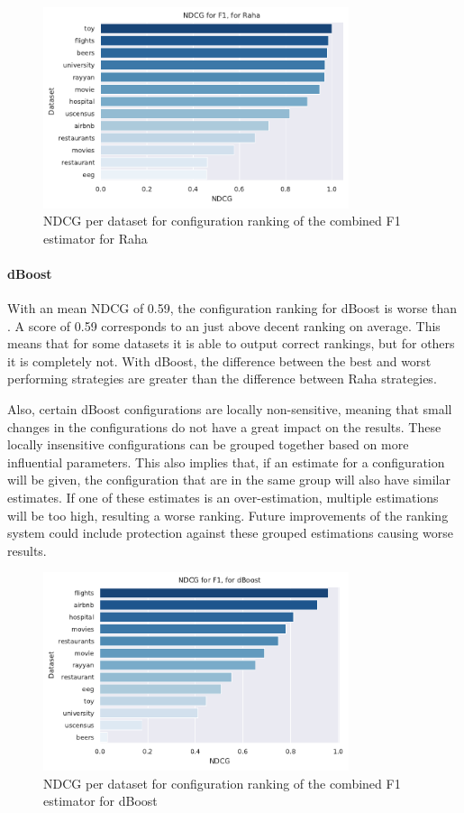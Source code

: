 \begin{figure}
    \centering
    \includegraphics[width=0.8\textwidth]{thesis/Figures/RQ3/15_combined_profiler_NDCG_Raha.pdf}
    \caption{NDCG per dataset for configuration ranking of the combined F1 estimator for Raha}
    \label{fig:ndcg_per_config_Raha}
\end{figure}

\paragraph{dBoost} With an mean NDCG of 0.59, the configuration ranking for dBoost is worse than . A score of 0.59 corresponds to an just above decent ranking on average. This means that for some datasets it is able to output correct rankings, but for others it is completely not. With dBoost, the difference between the best and worst performing strategies are greater than the difference between Raha strategies. 

Also, certain dBoost configurations are locally non-sensitive, meaning that small changes in the configurations do not have a great impact on the results. These locally insensitive configurations can be grouped together based on more influential parameters. This also implies that, if an estimate for a configuration will be given, the configuration that are in the same group will also have similar estimates. If one of these estimates is an over-estimation, multiple estimations will be too high, resulting a worse ranking. Future improvements of the ranking system could include protection against these grouped estimations causing worse results.

\begin{figure}[h]
    \centering
    \includegraphics[width=0.8\textwidth]{thesis/Figures/RQ3/15_combined_profiler_NDCG_dBoost.pdf}
    \caption{NDCG per dataset for configuration ranking of the combined F1 estimator for dBoost}
    \label{fig:ndcg_per_config_dBoost}
\end{figure}
